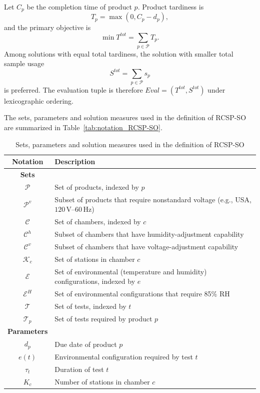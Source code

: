 \documentclass[11pt]{article}
\begin{document}
Let \(C_p\) be the completion time of product \(p\). Product tardiness is
\[
T_p=\max(0,C_p-d_p),
\]
and the primary objective is
\[
\min T^{tot}=\sum_{p\in\mathcal{P}}T_p.
\]
Among solutions with equal total tardiness, the solution with smaller total sample usage
\[
S^{tot}=\sum_{p\in\mathcal{P}}s_p
\]
is preferred. The evaluation tuple is therefore \(Eval=(T^{tot},S^{tot})\) under lexicographic ordering.

The sets, parameters and solution measures used in the definition of RCSP-SO are summarized in Table~\ref{tab:notation_RCSP-SO}.

\begin{table}[H]
\caption{Sets, parameters and solution measures used in the definition of RCSP-SO}
\label{tab:notation_RCSP-SO}
\label{tab:notation_short}
\centering
\small
\begin{tabular}{cl}
\toprule
\textbf{Notation} & \textbf{Description}\\
\midrule
\textbf{Sets} & \\
\midrule
\(\mathcal{P}\) & Set of products, indexed by \(p\) \\
\(\mathcal{P}^v\) & Subset of products that require nonstandard voltage (e.g., USA, \(120\,\mathrm{V}\)--\(60\,\mathrm{Hz}\)) \\
\(\mathcal{C}\) & Set of chambers, indexed by \(c\) \\
\(\mathcal{C}^h\) & Subset of chambers that have humidity-adjustment capability \\
\(\mathcal{C}^v\) & Subset of chambers that have voltage-adjustment capability \\
\(\mathcal{K}_c\) & Set of stations in chamber \(c\) \\
\(\mathcal{E}\) & Set of environmental (temperature and humidity) configurations, indexed by \(e\) \\
\(\mathcal{E}^H\) & Set of environmental configurations that require 85\% RH \\
\(\mathcal{T}\) & Set of tests, indexed by \(t\) \\
\(\mathcal{T}_p\) & Set of tests required by product \(p\) \\
\midrule
\textbf{Parameters} & \\
\midrule
\(d_p\) & Due date of product \(p\) \\
\(e(t)\) & Environmental configuration required by test \(t\) \\
\(\tau_t\) & Duration of test \(t\) \\
\(K_c\) & Number of stations in chamber \(c\) \\

\end{tabular}
\end{table}
\end{document}

